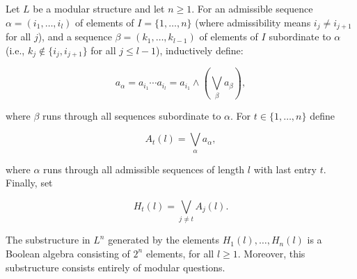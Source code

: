 Let $L$ be a modular structure and let $n \geqslant 1$. For an admissible sequence $\alpha = (i_1, \ldots, i_l)$ of elements of $I = \{1, \ldots, n\}$ (where admissibility means $i_j \neq i_{j+1}$ for all $j$), and a sequence $\beta = (k_1, \ldots, k_{l-1})$ of elements of $I$ subordinate to $\alpha$ (i.e., $k_j \notin \{i_j, i_{j+1}\}$ for all $j \leqslant l-1$), inductively define:

$$a_\alpha = a_{i_1} \cdots a_{i_l} = a_{i_1} \wedge \left(\bigvee_\beta a_\beta\right),$$

where $\beta$ runs through all sequences subordinate to $\alpha$. For $t \in \{1, \ldots, n\}$ define

$$A_t(l) = \bigvee_\alpha a_\alpha,$$

where $\alpha$ runs through all admissible sequences of length $l$ with last entry $t$. Finally, set

$$H_t(l) = \bigvee_{j \neq t} A_j(l).$$

The substructure in $L^n$ generated by the elements $H_1(l), \ldots, H_n(l)$ is a Boolean algebra consisting of $2^n$ elements, for all $l \geqslant 1$. Moreover, this substructure consists entirely of modular questions.
